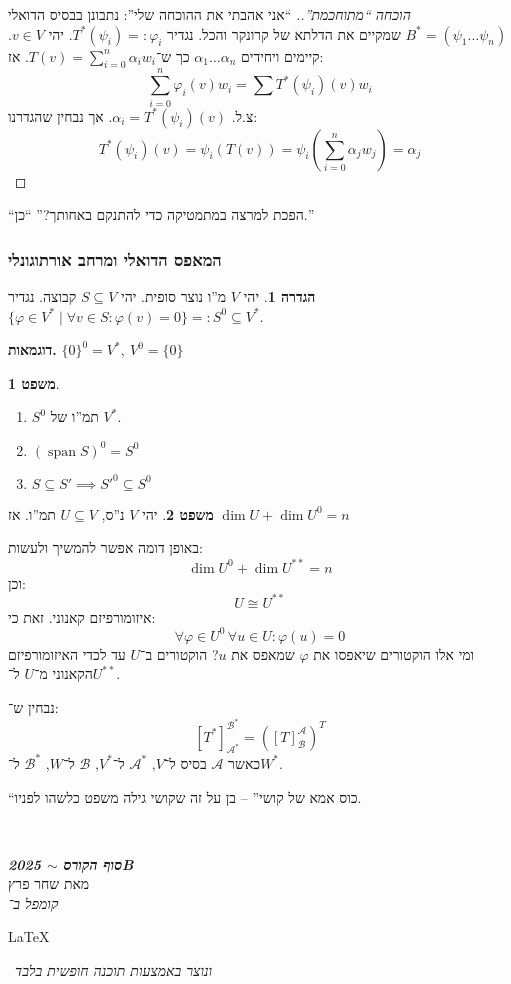 \documentclass[a4paper]{article}
\newcommand\en[1] {\begin{otherlanguage}{english}#1\end{otherlanguage}}
\newcommand\ac    {\mathcal{A}}
\newcommand\bc    {\mathcal{B}}
\newcommand\sumni     {\sum_{i = 0}^{n}}
\DeclareMathOperator{\Sp}      {span}
\newcommand\co        {\colon}
\newcommand\ag        {\alpha}
\newcommand\cl [1]    {\left ( #1 \right )}
\renewcommand\phi     {\varphi}
\theoremstyle{definition}
\newtheorem{Theorem}{\color{myblue}משפט}
\newtheorem{Definition}{\color{mygreen}הגדרה}
\newcommand\theo  [1] {\begin{Theorem}#1\end{Theorem}}
\newcommand\defi  [1] {\begin{Definition}#1\end{Definition}}
\begin{document}
	\begin{proof}[הוכחה ``מתוחכמת''.]
		``אני אהבתי את ההוכחה שלי'': נתבונן בבסיס הדואלי $B^* = (\psi_1 \dots \psi_n)$ שמקיים את הדלתא של קרונקר והכל. 
		נגדיר $T^*(\psi_i) =: \phi_i$. יהי $v \in V$. קיימים ויחידים $\ag_1 \dots \ag_n$ כך ש־$T(v) = \sumni \ag_i w_i$. אז: 
		\[ \sumni \phi_i(v)w_i = \sum T^*(\psi_i)(v) w_i \]
		צ.ל. $\ag_i = T^*(\psi_i)(v)$. אך נבחין שהגדרנו: 
		\[ T^*(\psi_i)(v) = \psi_i(T(v)) = \psi_i\cl{\sumni \ag_j w_j} = \ag_j \]
		
	\end{proof}
	
	``הפכת למרצה במתמטיקה כדי להתנקם באחותך?'' ``כן.''
	
	\subsubsection{המאפס הדואלי ומרחב אורתוגונלי}
	\defi{יהי $V$ מ''ו נוצר סופית. יהי $S \subseteq V$ קבוצה. נגדיר $\{\phi \in V^* \mid \forall v \in S \co \phi(v) = 0\} =: S^0 \subseteq V^*$. }
	
	\textbf{דוגמאות. } \hfil $\{0\}^0 = V^*, \ V^0 = \{0\}$
	
	\theo{\,
		\begin{enumerate}
			\item $S^0$ תמ''ו של $V^*$. 
			\item \hfil $(\Sp S)^0 = S^0$
			\item \hfil $S \subseteq S' \implies S'^0 \subseteq S^0$
	\end{enumerate}}
	
	\theo{יהי $V$ נ''ס, $U \subseteq V$ תמ''ו. אז $\dim U + \dim U^0 = n$}
	באופן דומה אפשר להמשיך ולעשות: 
	\[ \dim U^0 + \dim U^{**} = n \]
	וכן: 
	\[ U \cong U^{**} \]
	איזומורפיזם קאנוני. זאת כי:
	\[ \forall \phi \in U^0 \, \forall u \in U \co \phi(u) = 0 \]
	ומי אלו הוקטורים שיאפסו את $\phi$ שמאפס את $u$? הוקטורים ב־$U$ עד לכדי האיזומורפיזם הקאנוני מ־$U$ ל־$U^{**}$. 
	
	נבחין ש־: 
	\[ [T^*]^{\bc^*}_{\ac^*} = ([T]^{\ac}_{\bc})^T \]
	כאשר $\ac$ בסיס ל־$V$, $\ac^*$ ל־$V^*$, $\bc$ ל־$W$, $\bc^*$ ל־$W^*$. 
	
	``כוס אמא של קושי'' – בן על זה שקושי גילה משפט כלשהו לפניו. 
	
	{\dotfill \\ \vfil {\begin{center}
				{\Large \textbf{\textit{סוף הקורס $\sim$ 2025B}}\vspace{3pt} \\
					\normalsize מאת שחר פרץ
					\\
					\scriptsize \textit{קומפל ב־}\en{\LaTeX}\,\textit{ ונוצר באמצעות תוכנה חופשית בלבד}}
		\end{center}} \vfil	}
	
	
	
	
	
\end{document}
